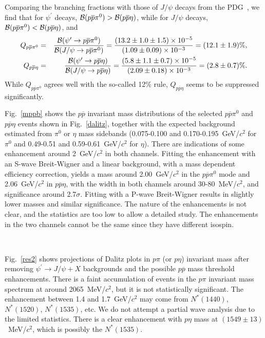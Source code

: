 \documentclass[prd,twocolumn,showpacs,amsmath,amssymb]{revtex4}
\newcommand{\BR}{{\cal B}}
\newcommand{\psp}{\psi^\prime}
\newcommand{\jpsi}{J/\psi}
\newcommand{\piz}{\pi^0}
\newcommand{\ppb}{p\overline{p}}
\newcommand{\jpsito}{J/\psi \rightarrow }
\newcommand{\psipto}{\psi^\prime \rightarrow }
\newcommand{\pspto}{\psi^\prime \rightarrow }
\begin{document}
Comparing the branching fractions with those of $\jpsi$ decays
from the PDG~\cite{pdg}, we find that for $\psp$ decays,
$\BR(\ppb\piz)>\BR(\ppb\eta)$, while for $\jpsi$ decays,
$\BR(\ppb\piz)<\BR(\ppb\eta)$, and
\begin{eqnarray*}
Q_{\ppb \piz}&=&\frac{\BR(\psipto\ppb \piz)}{\BR(\jpsito \ppb \piz)}=
\frac{(13.2\pm1.0\pm1.5)\times10^{-5}}{(1.09\pm0.09)\times10^{-3}}
= (12.1\pm 1.9) \%, \\
Q_{\ppb \eta}&=&\frac{\BR(\psipto\ppb \eta)}{\BR(\jpsito \ppb \eta)}=
\frac{(5.8\pm1.1\pm0.7)\times10^{-5}}{(2.09\pm0.18)\times10^{-3}}
= (2.8\pm0.7) \%.
\end{eqnarray*}
While $Q_{\ppb \piz}$ agrees well with the so-called 12\% rule,
$Q_{\ppb \eta}$ seems to be suppressed significantly.

Fig.~\ref{mppb} shows the $\ppb$ invariant mass distributions of
the selected $\ppb\piz$ and $\ppb\eta$ events shown in
Fig.~\ref{dalitz}, together with the expected background estimated
from $\piz$ or $\eta$ mass sidebands (0.075-0.100 and
0.170-0.195~GeV/$c^2$ for $\piz$ and 0.49-0.51 and
0.59-0.61~GeV/$c^2$ for $\eta$). There are indications of some
enhancement around 2~GeV/$c^2$ in both channels. Fitting the
enhancement with an S-wave Breit-Wigner and a linear background,
with a mass dependent efficiency correction, yields a mass around
2.00~GeV/$c^2$ in the $\ppb\piz$ mode and 2.06~GeV/$c^2$ in
$\ppb\eta$, with the width in both channels around
30-80~MeV/$c^2$, and significance around 2.7$\sigma$. Fitting with
a P-wave Breit-Wigner results in slightly lower masses and similar
significance. The nature of the enhancements is not clear, and the
statistics are too low to allow a detailed study. The enhancements
in the two channels cannot be the same since they have different
isospin.

\begin{figure*}[htb]
\centerline{\hbox{
}} \caption{$\ppb$
invariant mass distributions of selected (a) $\ppb\piz$  and (b)
$\ppb\eta$  events. The blank histograms are selected signal
events, and the shaded histograms are events from $\piz$ or $\eta$
mass sidebands. The dashed histograms are predictions of phase
space with S-wave $\ppb$ (not normalized).} \label{mppb}
\end{figure*}

Fig.~\ref{res2} shows projections of Dalitz plots in $p\pi$ (or
$p\eta$) invariant mass after removing $\pspto \jpsi + X$
backgrounds and the possible $\ppb$ mass threshold enhancements.
There is a faint accumulation of events in the $p\pi$ invariant
mass spectrum at around 2065~MeV/$c^2$, but it is not
statistically significant. The enhancement between 1.4 and
1.7~GeV/$c^2$ may come from $N^*(1440)$, $N^*(1520)$, $N^*(1535)$,
etc. We do not attempt a partial wave analysis due to the limited
statistics. There is a clear enhancement with $p\eta$ mass at
$(1549\pm 13)$~MeV/$c^2$, which is possibly the $N^*(1535)$.
\end{document}

